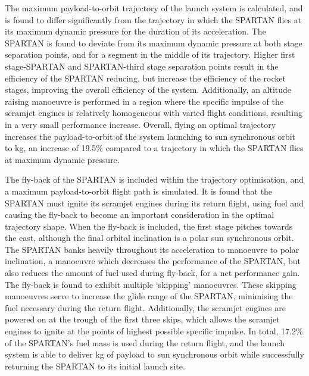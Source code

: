 The maximum payload-to-orbit trajectory of the launch system is calculated, and is found to differ significantly from the trajectory in which the SPARTAN flies at its maximum dynamic pressure for the duration of its acceleration. 
 The SPARTAN is found to deviate from its maximum dynamic pressure at both stage separation points, and for a segment in the middle of its trajectory.
 Higher first stage-SPARTAN and SPARTAN-third stage separation points result in the efficiency of the SPARTAN reducing, but increase the efficiency of the rocket stages, improving the overall efficiency of the system. 
  Additionally, an altitude raising manoeuvre is performed in a region where the specific impulse of the scramjet engines is relatively homogeneous with varied flight conditions, resulting in a very small performance increase. Overall, flying an optimal trajectory increases the payload-to-orbit of the system launching to sun synchronous orbit to \PayloadToOrbitStandardNoReturn kg, an increase of 19.5\% compared to a trajectory in which the SPARTAN flies at maximum dynamic pressure.  
 
 
 The fly-back of the SPARTAN is included within the trajectory optimisation, and a maximum payload-to-orbit flight path is simulated. 
 It is found that the SPARTAN must ignite its scramjet engines during its return flight, using fuel and causing the fly-back to become an important consideration in the optimal trajectory shape. When the fly-back is included, the first stage pitches towards the east, although the final orbital inclination is a polar sun synchronous orbit. The SPARTAN banks heavily throughout its acceleration to manoeuvre to polar inclination, a manoeuvre which decreases the performance of the SPARTAN, but also reduces the amount of fuel used during fly-back, for a net performance gain. 
The fly-back is found to exhibit multiple `skipping' manoeuvres. These skipping manoeuvres serve to increase the glide range of the SPARTAN, minimising the fuel necessary during the return flight. Additionally, the scramjet engines are powered on at the trough of the first three skips, which allows the scramjet engines to ignite at the points of highest possible specific impulse. In total, 17.2\% of the SPARTAN's fuel mass is used during the return flight, and the launch system is able to deliver \PayloadToOrbitStandard kg of payload to sun synchronous orbit while successfully returning the SPARTAN to its initial launch site.  

